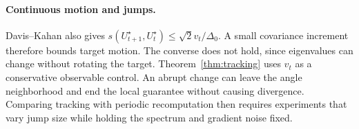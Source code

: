 \paragraph{Continuous motion and jumps.}
Davis--Kahan also gives
$s(U_{t+1}^\star,U_t^\star)\le\sqrt2v_t/\Delta_0$.
A small covariance increment therefore bounds target motion. The converse
does not hold, since eigenvalues can change without rotating the target.
Theorem~\ref{thm:tracking} uses $v_t$ as a conservative observable control.
An abrupt change can leave the angle neighborhood and end the local
guarantee without causing divergence. Comparing tracking with periodic
recomputation then requires experiments that vary jump size while holding
the spectrum and gradient noise fixed.
